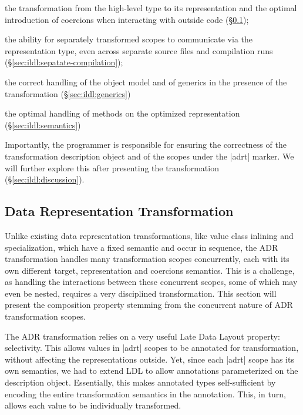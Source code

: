 \begin{compactitem}
\item the transformation from the high-level type to its representation and the optimal introduction of coercions when interacting with outside code (\S\ref{sec:ildl:ldl});
\item the ability for separately transformed scopes to communicate via the representation type, even across separate source files and compilation runs (\S\ref{sec:ildl:sepatate-compilation});
\item the correct handling of the object model and of generics in the presence of the transformation (\S\ref{sec:ildl:generics})
\item the optimal handling of methods on the optimized representation (\S\ref{sec:ildl:semantics})
\end{compactitem}

Importantly, the programmer is responsible for ensuring the correctness of the transformation description object and of the scopes under the |adrt| marker. We will further explore this after presenting the transformation (\S\ref{sec:ildl:discussion}).












\subsection{Data Representation Transformation}
\label{sec:ildl:ldl}

Unlike existing data representation transformations, like value class inlining and specialization, which have a fixed semantic and occur in sequence, the ADR transformation handles many transformation scopes concurrently, each with its own different target, representation and coercions semantics. This is a challenge, as handling the interactions between these concurrent scopes, some of which may even be nested, requires a very disciplined transformation. This section will present the composition property stemming from the concurrent nature of ADR transformation scopes.

The ADR transformation relies on a very useful Late Data Layout property: selectivity. This allows values in |adrt| scopes to be annotated for transformation, without affecting the representations outside. Yet, since each |adrt| scope has its own semantics, we had to extend LDL to allow annotations parameterized on the description object. Essentially, this makes annotated types self-sufficient by encoding the entire transformation semantics in the annotation. This, in turn, allows each value to be individually transformed.


